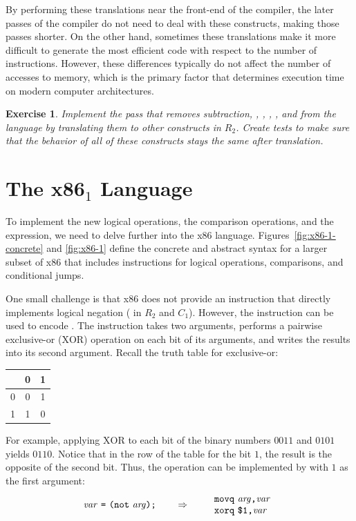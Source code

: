 \documentclass[11pt]{book}
\newtheorem{exercise}[theorem]{Exercise}
\begin{document}
By performing these translations near the front-end of the compiler,
the later passes of the compiler do not need to deal with these
constructs, making those passes shorter. On the other hand, sometimes
these translations make it more difficult to generate the most
efficient code with respect to the number of instructions. However,
these differences typically do not affect the number of accesses to
memory, which is the primary factor that determines execution time on
modern computer architectures.

\begin{exercise}\normalfont
  Implement the pass  that removes subtraction,
  , , \key{<=}, \key{>}, and \key{>=} from the language
  by translating them to other constructs in $R_2$.  Create tests to
  make sure that the behavior of all of these constructs stays the
  same after translation.
\end{exercise}


\section{The x86$_1$ Language}
\label{sec:x86-1}

To implement the new logical operations, the comparison operations,
and the  expression, we need to delve further into the x86
language. Figures~\ref{fig:x86-1-concrete} and \ref{fig:x86-1} define
the concrete and abstract syntax for a larger subset of x86 that
includes instructions for logical operations, comparisons, and
conditional jumps.

One small challenge is that x86 does not provide an instruction that
directly implements logical negation ( in $R_2$ and $C_1$).
However, the  instruction can be used to encode .
The  instruction takes two arguments, performs a pairwise
exclusive-or ($\mathrm{XOR}$) operation on each bit of its arguments,
and writes the results into its second argument.  Recall the truth
table for exclusive-or:
\begin{center}
\begin{tabular}{l|cc}
   & 0 & 1 \\ \hline
0  & 0 & 1 \\
1  & 1 & 0
\end{tabular}
\end{center}
For example, applying $\mathrm{XOR}$ to each bit of the binary numbers
$0011$ and $0101$ yields $0110$. Notice that in the row of the table
for the bit $1$, the result is the opposite of the second bit.  Thus,
the  operation can be implemented by  with $1$ as
the first argument:
\[
\mathit{var}~ \texttt{=}~ \texttt{(}\texttt{not}~\mathit{arg}\texttt{)}\texttt{;}
\qquad\Rightarrow\qquad
\begin{array}{l}
\texttt{movq}~ \mathit{arg}\texttt{,} \mathit{var}\\
\texttt{xorq}~ \texttt{\$1,} \mathit{var}
\end{array}
\]
\end{document}
